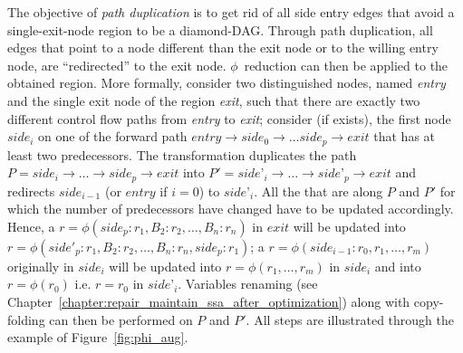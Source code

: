 The objective of \emph{path duplication} is to get rid of all side entry edges that avoid a single-exit-node region to be a diamond-DAG. Through path duplication, all edges that point to a node different than the exit node or to the willing entry node, are ``redirected'' to the exit node. $\phi$~reduction can then be applied to the obtained region. More formally, consider two distinguished nodes, named \textit{entry} and the single exit node of the region \textit{exit}, such that there are exactly two different control flow paths from \textit{entry} to \textit{exit}; consider (if exists), the first node $\textit{side}_i$ on one of the forward path $\textit{entry}\rightarrow \textit{side}_0\rightarrow\dots\textit{side}_p\rightarrow\textit{exit}$ that has at least two predecessors. The transformation duplicates the path $P=\textit{side}_i\rightarrow\dots\rightarrow\textit{side}_p\rightarrow\textit{exit}$ into $P'=\textit{side'}_i\rightarrow\dots\rightarrow\textit{side'}_p\rightarrow\textit{exit}$ and redirects $\textit{side}_{i-1}$ (or $\textit{entry}$ if $i=0$) to $\textit{side'}_i$. All the \phifuns that are along $P$ and $P'$  for which the number of predecessors have changed have to be updated accordingly. Hence, a $r=\phi(\textit{side}_p:r_1,B_2:r_2,\dots,B_n:r_n)$ in $\textit{exit}$  will be updated into $r=\phi(\textit{side}'_p:r_1,B_2:r_2,\dots,B_n:r_n,\textit{side}_p:r_1)$; a $r=\phi(\textit{side}_{i-1}:r_0, r_1, \dots, r_m)$ originally in $\textit{side}_i$ will be updated into $r=\phi(r_1, \dots, r_m)$ in $\textit{side}_i$ and into $r=\phi(r_0)$ i.e. $r=r_0$ in $\textit{side'}_i$. Variables renaming (see Chapter~\ref{chapter:repair_maintain_ssa_after_optimization}) along with copy-folding can then be performed on $P$ and $P'$. All steps are illustrated  through the example of Figure~\ref{fig:phi_aug}.


